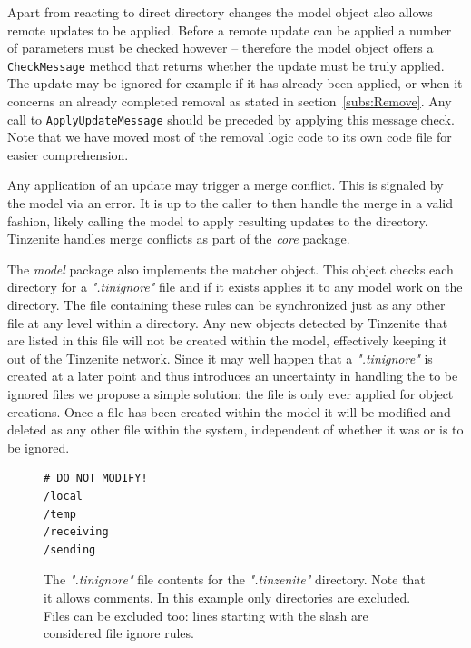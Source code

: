 Apart from reacting to direct directory changes the model object also allows remote updates to be applied.
Before a remote update can be applied a number of parameters must be checked however -- therefore the model object offers a \texttt{CheckMessage} method that returns whether the update must be truly applied.
The update may be ignored for example if it has already been applied, or when it concerns an already completed removal as stated in section~\ref{subs:Remove}.
Any call to \texttt{ApplyUpdateMessage} should be preceded by applying this message check.
Note that we have moved most of the removal logic code to its own code file for easier comprehension.

Any application of an update may trigger a merge conflict.
This is signaled by the model via an error.
It is up to the caller to then handle the merge in a valid fashion, likely calling the model to apply resulting updates to the directory.
Tinzenite handles merge conflicts as part of the \emph{core} package.

The \emph{model} package also implements the matcher object.
This object checks each directory for a \textit{".tinignore"} file and if it exists applies it to any model work on the directory.
The file containing these rules can be synchronized just as any other file at any level within a directory.
Any new objects detected by Tinzenite that are listed in this file will not be created within the model, effectively keeping it out of the Tinzenite network.
Since it may well happen that a \textit{".tinignore"} is created at a later point and thus introduces an uncertainty in handling the to be ignored files we propose a simple solution: the file is only ever applied for object creations.
Once a file has been created within the model it will be modified and deleted as any other file within the system, independent of whether it was or is to be ignored.

\begin{figure}[htp]
    \begin{lstlisting}[language=golang,firstnumber=0]
# DO NOT MODIFY!
/local
/temp
/receiving
/sending
    \end{lstlisting}
\caption[Meta Ignore File]{The \textit{".tinignore"} file contents for the \textit{".tinzenite"} directory. Note that it allows comments. In this example only directories are excluded. Files can be excluded too: lines starting with the slash are considered file ignore rules.}
\label{tinignore:meta}
\end{figure}

